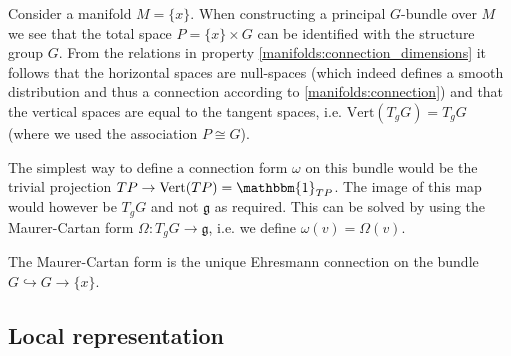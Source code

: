 	
	\begin{construct}
		Consider a manifold $M = \{x\}$. When constructing a principal $G$-bundle over $M$ we see that the total space $P = \{x\}\times G$ can be identified with the structure group $G$. From the relations in property \ref{manifolds:connection_dimensions} it follows that the horizontal spaces are null-spaces (which indeed defines a smooth distribution and thus a connection according to \ref{manifolds:connection}) and that the vertical spaces are equal to the tangent spaces, i.e. $\text{Vert}(T_gG) = T_gG$ (where we used the association $P\cong G$).
		
		The simplest way to define a connection form $\omega$ on this bundle would be the trivial projection $TP\rightarrow\text{Vert}(TP) = \mathbbm{1}_{TP}$. The image of this map would however be $T_gG$ and not $\mathfrak{g}$ as required. This can be solved by using the Maurer-Cartan form $\Omega:T_gG\rightarrow\mathfrak{g}$, i.e. we define $\omega(v) = \Omega(v)$.
	\end{construct}
	
	\begin{property}
		The Maurer-Cartan form is the unique Ehresmann connection on the bundle $G\hookrightarrow G\rightarrow \{x\}$.
	\end{property}

\subsection{Local representation}

	
